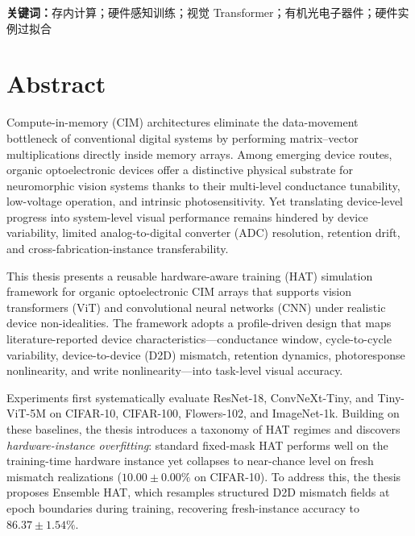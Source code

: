 \vspace{1em}
\noindent\textbf{关键词：}存内计算；硬件感知训练；视觉 Transformer；有机光电子器件；硬件实例过拟合

\vspace{2em}

\chapter*{Abstract}

Compute-in-memory (CIM) architectures eliminate the data-movement bottleneck of conventional digital systems by performing matrix--vector multiplications directly inside memory arrays.
Among emerging device routes, organic optoelectronic devices offer a distinctive physical substrate for neuromorphic vision systems thanks to their multi-level conductance tunability, low-voltage operation, and intrinsic photosensitivity.
Yet translating device-level progress into system-level visual performance remains hindered by device variability, limited analog-to-digital converter (ADC) resolution, retention drift, and cross-fabrication-instance transferability.

This thesis presents a reusable hardware-aware training (HAT) simulation framework for organic optoelectronic CIM arrays that supports vision transformers (ViT) and convolutional neural networks (CNN) under realistic device non-idealities.
The framework adopts a profile-driven design that maps literature-reported device characteristics---conductance window, cycle-to-cycle variability, device-to-device (D2D) mismatch, retention dynamics, photoresponse nonlinearity, and write nonlinearity---into task-level visual accuracy.

Experiments first systematically evaluate ResNet-18, ConvNeXt-Tiny, and Tiny-ViT-5M on CIFAR-10, CIFAR-100, Flowers-102, and ImageNet-1k.
Building on these baselines, the thesis introduces a taxonomy of HAT regimes and discovers \emph{hardware-instance overfitting}:
standard fixed-mask HAT performs well on the training-time hardware instance yet collapses to near-chance level on fresh mismatch realizations ($10.00\pm0.00\%$ on CIFAR-10).
To address this, the thesis proposes Ensemble HAT, which resamples structured D2D mismatch fields at epoch boundaries during training, recovering fresh-instance accuracy to $86.37\pm1.54\%$.

